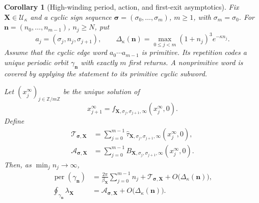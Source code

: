 \documentclass[11pt]{amsart}
\numberwithin{equation}{section}
\newtheorem{corollary}[theorem]{Corollary}
\theoremstyle{definition}
\theoremstyle{remark}
\newcommand{\cU}{\mathcal U}
\begin{document}
\begin{corollary}[High-winding period, action, and first-exit asymptotics]
\label{cor:period-action-asymptotics}
Fix $\mathbf X\in\cU_\kappa$ and a cyclic sign sequence
$\boldsymbol\sigma=(\sigma_0,\ldots,\sigma_m)$, $m\ge1$, with
$\sigma_m=\sigma_0$.  For
$\mathbf n=(n_0,\ldots,n_{m-1})$, $n_j\ge N$, put
\begin{equation}\label{eq:periodic-error-scale}
 a_j=(\sigma_j,n_j,\sigma_{j+1}),\qquad
 \Delta_\kappa(\mathbf n)
 =\max_{0\le j<m}(1+n_j)^3e^{-\kappa n_j}.
\end{equation}
Assume that the cyclic edge word $a_0\cdots a_{m-1}$ is primitive.  Its
repetition codes a unique periodic orbit $\gamma_{\mathbf n}$ with exactly
$m$ first returns.  A nonprimitive word is covered by applying the statement
to its primitive cyclic subword.

Let $(x_j^\infty)_{j\in\mathbb Z/m\mathbb Z}$ be the unique solution of
\begin{equation}\label{eq:limiting-cyclic-cross-form}
 x_{j+1}^\infty
 =f_{\mathbf X,\sigma_j,\sigma_{j+1},\infty}
       (x_j^\infty,0).
\end{equation}
Define
\begin{align}
 \mathcal T_{\boldsymbol\sigma,\mathbf X}
 &=\sum_{j=0}^{m-1}
   \widehat\tau_{\mathbf X,\sigma_j,\sigma_{j+1},\infty}
       (x_j^\infty,0),\label{eq:limiting-period-constant}\\
 \mathcal A_{\boldsymbol\sigma,\mathbf X}
 &=\sum_{j=0}^{m-1}
   B_{\mathbf X,\sigma_j,\sigma_{j+1},\infty}
       (x_j^\infty,0).
 \label{eq:limiting-action-constant}
\end{align}
Then, as $\min_jn_j\to\infty$,
\begin{align}
 \operatorname{per}(\gamma_{\mathbf n})
 &=\frac{2\pi}{\beta_{\mathbf X}}\sum_{j=0}^{m-1}n_j
   +\mathcal T_{\boldsymbol\sigma,\mathbf X}
   +O\bigl(\Delta_\kappa(\mathbf n)\bigr),
 \label{eq:period-asymptotic}\\
 \oint_{\gamma_{\mathbf n}}\lambda_{\mathbf X}
 &=\mathcal A_{\boldsymbol\sigma,\mathbf X}
   +O\bigl(\Delta_\kappa(\mathbf n)\bigr).
 \label{eq:action-asymptotic}
\end{align}


\end{corollary}
\end{document}
